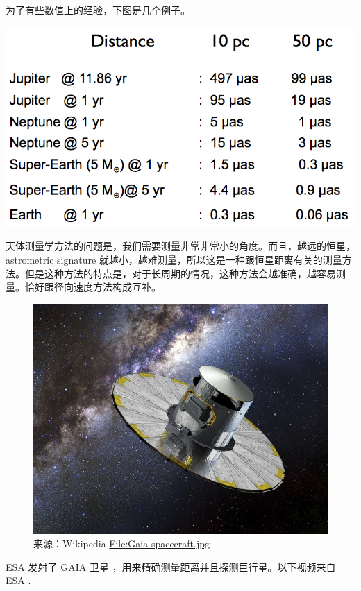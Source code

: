 \documentclass[letterpaper,10pt,english]{sphinxmanual}
\begin{document}
为了有些数值上的经验，下图是几个例子。\footnotemark[1]

{\hfill\includegraphics{astrometrySolar.png}\hfill}

天体测量学方法的问题是，我们需要测量非常非常小的角度。而且，越远的恒星，astrometric signature 就越小，越难测量，所以这是一种跟恒星距离有关的测量方法。但是这种方法的特点是，对于长周期的情况，这种方法会越准确，越容易测量。恰好跟径向速度方法构成互补。
\begin{figure}[htbp]
\centering
\capstart

\includegraphics{Gaia_spacecraft.jpg}
\caption{来源：Wikipedia \href{https://en.wikipedia.org/wiki/File:Gaia\_spacecraft.jpg}{File:Gaia spacecraft.jpg}}\end{figure}

ESA 发射了 \href{http://www.esa.int/spaceinvideos/Videos/2013/12/Inside\_Gaia\_s\_billion-pixel\_camera}{GAIA 卫星} ，用来精确测量距离并且探测巨行星。以下视频来自 \href{http://www.esa.int/spaceinvideos/Videos/2013/12/Inside\_Gaia\_s\_billion-pixel\_camera}{ESA} .
\end{document}
